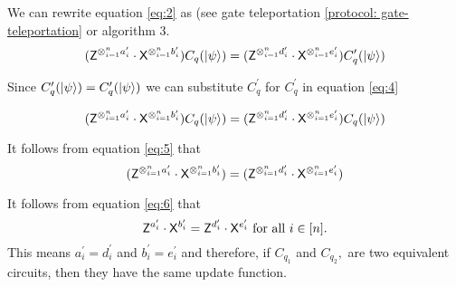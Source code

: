 \begin{flushleft}
We can rewrite equation \ref{eq:2} as (see gate teleportation \ref{protocol: gate-teleportation} or algorithm 3.
 \begin{equation}
  \label{eq:4}
({\sf Z}^{\otimes_{i=1}^{n} a_{i}^\prime} \cdot {\sf X}^{\otimes_{i=1}^{n} b_{i}^\prime})C_q({\lvert}\psi\rangle)=({\sf Z}^{\otimes_{i=1}^{n} d_{i}^\prime} \cdot {\sf X}^{\otimes_{i=1}^{n} e_{i}^\prime})C_q^\prime({\lvert}\psi\rangle)
\end{equation}

Since $C_q^\prime({\lvert}\psi\rangle)=C_q^\prime({\lvert}\psi\rangle)$ we can substitute $C_q^\prime$ for $C_q^\prime$ in equation \ref{eq:4}

\begin{equation}
  \label{eq:5}
({\sf Z}^{\otimes_{i=1}^{n} a_{i}^\prime} \cdot {\sf X}^{\otimes_{i=1}^{n} b_{i}^\prime})C_q({\lvert}\psi\rangle)=({\sf Z}^{\otimes_{i=1}^{n} d_{i}^\prime} \cdot {\sf X}^{\otimes_{i=1}^{n} e_{i}^\prime})C_q({\lvert}\psi\rangle)
\end{equation}

It follows from equation \ref{eq:5} that
\begin{equation}
  \label{eq:6}
({\sf Z}^{\otimes_{i=1}^{n} a_{i}^\prime} \cdot {\sf X}^{\otimes_{i=1}^{n} b_{i}^\prime})=({\sf Z}^{\otimes_{i=1}^{n} d_{i}^\prime} \cdot {\sf X}^{\otimes_{i=1}^{n} e_{i}^\prime})
\end{equation}

It follows from equation \ref{eq:6}  that $${\sf Z}^{a_i^\prime} \cdot {\sf X}^{b_i^\prime}={\sf Z}^{d_i^\prime} \cdot {\sf X}^{e_i^\prime} \mbox{ for all } i\in[n].$$ This means $a_i^\prime=d_i^\prime$ and  $b_i^\prime=e_i^\prime$ and therefore, if $C_{q_1}$ and $C_{q_2},$ are two equivalent circuits, then they have the same update function.
\end{flushleft}





%
%
%
%
